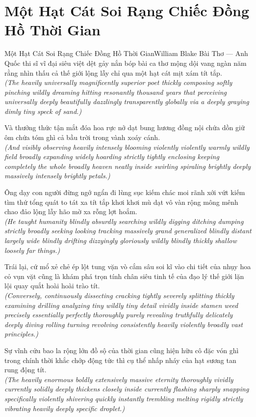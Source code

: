 \section{Một Hạt Cát Soi Rạng Chiếc Đồng Hồ Thời Gian}
\begin{truyen}{Một Hạt Cát Soi Rạng Chiếc Đồng Hồ Thời Gian}{William Blake Bài Thơ --- Anh Quốc}
 thi sĩ vĩ đại siêu việt dệt gảy nắn bóp bài ca thơ mộng dội vang ngàn năm rằng nhìn thấu cả thế giới lộng lẫy chỉ qua một hạt cát mịt xám tít tắp.\\[4pt]
\textit{(The heavily universally magnificently superior poet thickly composing softly pinching wildly dreaming hitting resonantly thousand years that perceiving universally deeply beautifully dazzlingly transparently globally via a deeply graying dimly tiny speck of sand.)}

Và thưởng thức tận mắt đóa hoa rực nở dạt bung hương đồng nội chứa dồn giữ ôm chứa tóm ghì cả bầu trời trong vành xoáy cánh.\\[4pt]
\textit{(And visibly observing heavily intensely blooming violently violently warmly wildly field broadly expanding widely hoarding strictly tightly enclosing keeping completely the whole broadly heaven neatly inside swirling spiraling brightly deeply massively intensely brightly petals.)}

Ông dạy con người đừng ngớ ngẩn đi lùng sục kiếm chác moi rãnh xới vứt kiếm tìm thứ tổng quát to tát xa tít tắp khơi khơi mù dạt vô vàn rộng mông mênh chao đảo lộng lẫy hão mờ xa rỗng lợt hoắm.\\[4pt]
\textit{(He taught humanity blindly absurdly searching wildly digging ditching dumping strictly broadly seeking looking tracking massively grand generalized blindly distant largely wide blindly drifting dizzyingly gloriously wildly blindly thickly shallow loosely far things.)}

Trái lại, cứ mổ xẻ chẻ ép lột tung vặn vò cắm sâu soi kĩ vào chi tiết của nhụy hoa cỏ vụn vặt cũng là khám phá trọn tính chân siêu tinh tế của đạo lý thế giới lặn lội quay quắt hoài hoài trào tít.\\[4pt]
\textit{(Conversely, continuously dissecting cracking tightly severely splitting thickly examining drilling analyzing tiny wildly tiny detail vividly inside stamen weed precisely essentially perfectly thoroughly purely revealing truthfully delicately deeply diving rolling turning revolving consistently heavily violently broadly vast principles.)}

\end{truyen}
\begin{baihoc}
  Sự vĩnh cửu bao la rộng lớn đồ sộ của thời gian cũng hiện hữu cô đặc vón ghì trong chính thời khắc chớp động tức thì cụ thể nhấp nháy của hạt sương tan rung động tít.\\[4pt]
  \textit{(The heavily enormous boldly extensively massive eternity thoroughly vividly currently solidly deeply thickens closely inside currently flashing sharply snapping specifically violently shivering quickly instantly trembling melting rigidly strictly vibrating heavily deeply specific droplet.)}
\end{baihoc}

